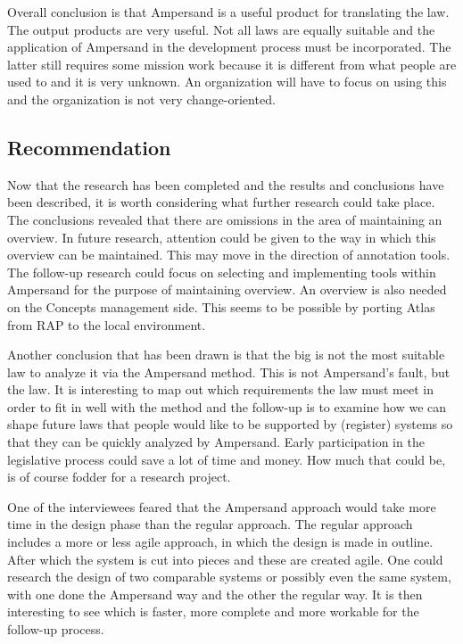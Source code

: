 Overall conclusion is that Ampersand is a useful product for translating the law.
The output products are very useful.
Not all laws are equally suitable and the application of Ampersand in the development process must be incorporated.
The latter still requires some mission work because it is different from what people are used to and it is very unknown.
An organization will have to focus on using this and the organization is not very change-oriented.


\subsection{Recommendation}\label{recommendation}
Now that the research has been completed and the results and conclusions have been described, it is worth considering what further research could take place.
The conclusions revealed that there are omissions in the area of maintaining an overview.
In future research, attention could be given to the way in which this overview can be maintained.
This may move in the direction of annotation tools.
The follow-up research could focus on selecting and implementing tools within Ampersand for the purpose of maintaining overview.
An overview is also needed on the Concepts management side.
This seems to be possible by porting Atlas from RAP to the local environment.

Another conclusion that has been drawn is that the \acrshort{big} is not the most suitable law to analyze it via the Ampersand method.
This is not Ampersand's fault, but the law.
It is interesting to map out which requirements the law must meet in order to fit in well with the method and the follow-up is to examine how we can shape future laws that people would like to be supported by (register) systems so that they can be quickly analyzed by Ampersand.
Early participation in the legislative process could save a lot of time and money.
How much that could be, is of course fodder for a research project.

One of the interviewees feared that the Ampersand approach would take more time in the design phase than the regular approach.
The regular approach includes a more or less agile approach, in which the design is made in outline.
After which the system is cut into pieces and these are created agile.
One could research the design of two comparable systems or possibly even the same system, with one done the Ampersand way and the other the regular way.
It is then interesting to see which is faster, more complete and more workable for the follow-up process.

